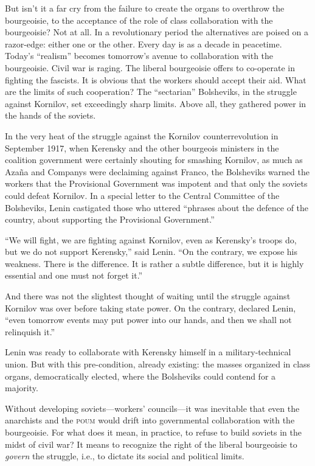 But isn’t it a far cry from the failure to create the organs to overthrow the bourgeoisie, to the acceptance of the role of class collaboration with the bourgeoisie? Not at all. In a revolutionary period the alternatives are poised on a razor-edge: either one or the other. Every day is as a decade in peacetime. Today’s ``realism'' becomes tomorrow’s avenue to collaboration with the bourgeoisie. Civil war is raging. The liberal bourgeoisie offers to co-operate in fighting the fascists. It is obvious that the workers should accept their aid. What are the limits of such cooperation? The ``sectarian'' Bolsheviks, in the struggle against Kornilov, set exceedingly sharp limits. Above all, they gathered power in the hands of the soviets.
\nowidow

In the very heat of the struggle against the Kornilov counterrevolution in September 1917, when Kerensky and the other bourgeois ministers in the coalition government were certainly shouting for smashing Kornilov, as much as Azaña and Companys were declaiming against Franco, the Bolsheviks warned the workers that the Provisional Government was impotent and that only the soviets could defeat Kornilov. In a special letter to the Central Committee of the Bolsheviks, Lenin castigated those who uttered ``phrases about the defence of the country, about supporting the Provisional Government.''

``We will fight, we are fighting against Kornilov, even as Kerensky’s troops do, but we do not support Kerensky,'' said Lenin. ``On the contrary, we expose his weakness. There is the difference. It is rather a subtle difference, but it is highly essential and one must not forget it.''

And there was not the slightest thought of waiting until the struggle against Kornilov was over before taking state power. On the contrary, declared Lenin, ``even tomorrow events may put power into our hands, and then we shall not relinquish it.''

Lenin was ready to collaborate with Kerensky himself in a military-technical union. But with this pre-condition, already existing: the masses organized in class organs, democratically elected, where the Bolsheviks could contend for a majority.

Without developing soviets---workers’ councils---it was inevitable that even the anarchists and the \textsc{poum} would drift into governmental collaboration with the bourgeoisie. For what does it mean, in practice, to refuse to build soviets in the midst of civil war? It means to recognize the right of the liberal bourgeoisie to \emph{govern} the struggle, i.e., to dictate its social and political limits.

